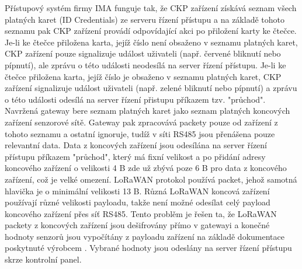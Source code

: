 Přístupový systém firmy IMA funguje tak, že CKP zařízení získává seznam všech platných karet (ID Credentials) ze serveru řízení přístupu a na základě tohoto seznamu pak CKP zařízení provádí odpovídající akci po přiložení karty ke čtečce. 
Je-li ke čtečce přiložena karta, jejíž číslo není obsaženo v seznamu platných karet, CKP zařízení pouze signalizuje událost uživateli (např. červené bliknutí nebo pípnutí), ale zprávu o této události neodesílá na server řízení přístupu. Je-li ke čtečce přiložena karta, jejíž číslo je obsaženo v seznamu platných karet, CKP zařízení signalizuje událost uživateli (např. zelené bliknutí nebo pípnutí) a zprávu o této události odesílá na server řízení přistupu příkazem tzv. "průchod".
Navržená gateway bere seznam platných karet jako seznam platných koncových zařízení senzorové sítě. Gateway pak zpracovává packety pouze od zařízení z tohoto seznamu a ostatní ignoruje, tudíž v síti RS485 jsou přenášena pouze relevantní data.
Data z koncových zařízení jsou odesílána na server řízení přístupu příkazem "průchod", který má fixní velikost a po přidání adresy koncového zařízení o velikosti 4 B zde už zbývá poze 6 B pro data z koncového zařízení, což je velké omezení.
LoRaWAN protokol používá packet, jehož samotná hlavička je o minimální velikosti 13 B. 
Různá LoRaWAN koncová zařízení používají různé velikosti payloadu, takže není možné odesílat celý payload koncového zařízení přes síť RS485.
Tento problěm je řešen ta, že LoRaWAN packety z koncových zařízení jsou dešifrovány přímo v gatewayi a konečné hodnoty senzorů jsou vypočítány z payloadu zařízení na základě dokumentace poskytnuté výrobcem \cite{RHF1S001 pdf}. Vybrané hodnoty jsou odeslány na server řízení přístupu skrze kontrolní panel. 




